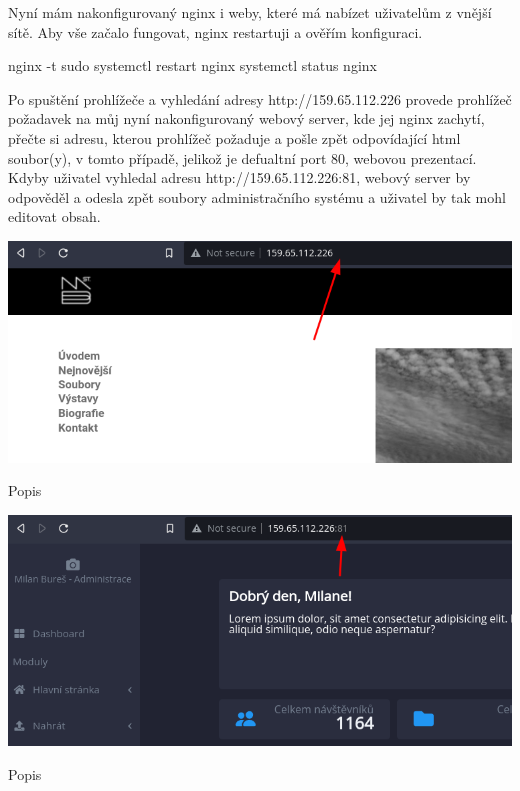 \documentclass[12pt,a4paper]{report}
\begin{document}
  Nyní mám nakonfigurovaný nginx i weby, které má nabízet uživatelům z vnější sítě.
  Aby vše začalo fungovat, nginx restartuji a ověřím konfiguraci.
  \begin{bash}
    nginx -t
    sudo systemctl restart nginx
    systemctl status nginx
  \end{bash}

  Po spuštění prohlížeče a vyhledání adresy http://159.65.112.226 provede prohlížeč
  požadavek na můj nyní nakonfigurovaný webový server, kde jej nginx zachytí, přečte si adresu, kterou prohlížeč požaduje a 
  pošle zpět odpovídající html soubor(y), v tomto případě, jelikož je defualtní port 80, webovou prezentací.
  Kdyby uživatel vyhledal adresu http://159.65.112.226:81, webový server by odpověděl a odesla zpět soubory administračního systému a uživatel by tak mohl editovat 
  obsah.

  \vspace*{0.5cm}
  \noindent\includegraphics[width=\linewidth]{VPS_WEB.png}
  \begin{center}
    Popis
  \end{center}
  \vspace*{0.5cm}
  \vspace*{0.5cm}
  \noindent\includegraphics[width=\linewidth]{VPS_CMS.png}
  \begin{center}
    Popis
  \end{center}
  \vspace*{0.5cm}
\end{document}
